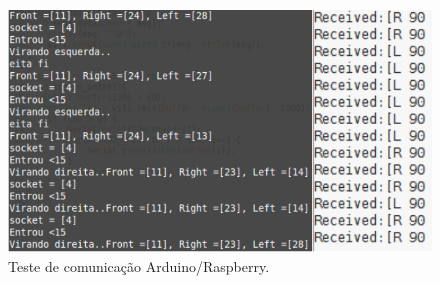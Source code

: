 \begin{itemize}
				\begin{figure}[H]                                                           
			  		\centering                    
			  		\includegraphics[scale=0.4]{figuras/teste_arduino_rasp}               
			  		\caption{Teste de comunicação Arduino/Raspberry.}    
			  		\label{img:dois_lados_comunicacao}                                            
				\end{figure}

		\end{itemize}
